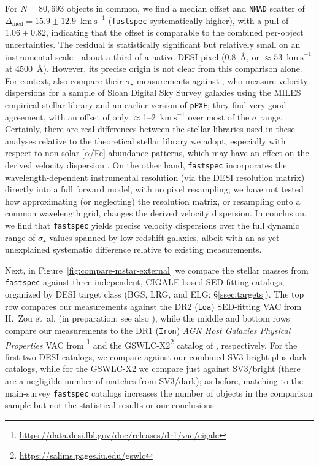 \documentclass[modern,linenumbers]{aastex702}
\newcommand{\fastspec}{\texttt{fastspec}}
\newcommand{\kms}{\ensuremath{\mathrm{km~s}^{-1}}}
\newcommand{\vdisp}{\ensuremath{\sigma_\star}}
\begin{document}
For $N=80,693$ objects in common, we find a median offset and
\texttt{NMAD} scatter of $\Delta_\mathrm{med}=15.9\pm12.9$~\kms{}
(\fastspec{} systematically higher), with a pull of
$1.06\pm0.82$, indicating that the offset is comparable to the
combined per-object uncertainties. The residual is statistically significant but
relatively small on an instrumental scale---about a third of a native
DESI pixel ($0.8$~\AA, or $\approx53$~\kms{} at 4500~\AA). However,
its precise origin is not clear from this comparison alone. For
context, \citet{ross25a} also compare their \vdisp{} measurements
against \citet{thomas13a}, who measure velocity dispersions for a
sample of Sloan Digital Sky Survey \citep[SDSS;][]{york00a} galaxies
using the MILES empirical stellar library \citep{sanchez-blazquez06a}
and an earlier version of \texttt{pPXF}; they find very good
agreement, with an offset of only $\approx$1--2~\kms{} over most of
the $\sigma$ range. Certainly, there are real differences between the
stellar libraries used in these analyses relative to the theoretical
stellar library we adopt, especially with respect to non-solar
[$\alpha$/Fe] abundance patterns, which may have an effect on the
derived velocity dispersion \citep[e.g.,][]{conroy14a, pernet24a}. On
the other hand, \fastspec{} incorporates the wavelength-dependent
instrumental resolution (via the DESI resolution matrix) directly into
a full forward model, with no pixel resampling; we have not tested how
approximating (or neglecting) the resolution matrix, or resampling
onto a common wavelength grid, changes the derived velocity
dispersion. In conclusion, we find that \fastspec{} yields
precise velocity dispersions over the full dynamic range of \vdisp{}
values spanned by low-redshift galaxies, albeit with an as-yet
unexplained systematic difference relative to existing measurements.

Next, in Figure~\ref{fig:compare-mstar-external} we compare the
stellar masses from \fastspec{} against three independent,
CIGALE-based \citep{boquien19a} SED-fitting catalogs, organized by
DESI target class (BGS, LRG, and ELG; \S\ref{ssec:targets}). The top
row compares our measurements against the DR2 (\texttt{Loa})
SED-fitting VAC from H.~Zou et~al. (in preparation; see also
\citealt{zou24b, sui26a}), while the middle and bottom rows compare
our measurements to the DR1 (\texttt{Iron}) \textit{AGN Host Galaxies
  Physical Properties} VAC from
\citet[\texttt{v1.2};][]{siudek24a}\footnote{\url{https://data.desi.lbl.gov/doc/releases/dr1/vac/cigale}}
and the GSWLC-X2\footnote{\url{https://salims.pages.iu.edu/gswlc}}
catalog of \citet{salim16a, salim18a}, respectively. For the first two
DESI catalogs, we compare against our combined SV3 bright plus dark
catalogs, while for the GSWLC-X2 we compare just against SV3/bright
(there are a negligible number of matches from SV3/dark); as before,
matching to the main-survey \fastspec{} catalogs increases the number
of objects in the comparison sample but not the statistical results or
our conclusions.
\end{document}
